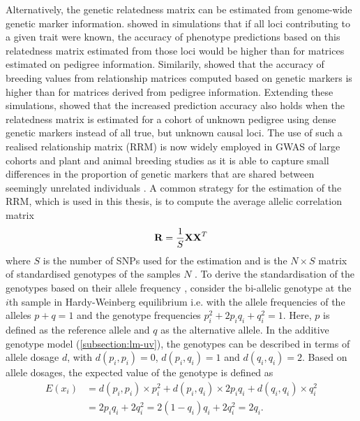 Alternatively, the genetic relatedness matrix can be estimated from genome-wide genetic marker information. \citet{Nejati-Javaremi1997} showed in simulations that if all loci contributing to a given trait were known, the accuracy of phenotype predictions based on this relatedness matrix estimated from those loci would be higher than for matrices estimated on pedigree information. Similarily, \citet{Villanueva2005} showed that the accuracy of breeding values from relationship matrices computed based on genetic markers is higher than for matrices derived from pedigree information. Extending these simulations, \citet{Hayes2009} showed that the increased prediction accuracy also holds when the relatedness matrix is estimated for a cohort of unknown pedigree using dense genetic markers instead of all true, but unknown causal loci. The use of such a realised relationship matrix (RRM) is now widely employed in GWAS of large cohorts and plant and animal breeding studies as it is able to capture small differences in the proportion of genetic markers that are shared between seemingly unrelated individuals \citep{Lee2010,Lopes2013}. A common strategy for the estimation of the RRM, which is used in this thesis, is to compute the average allelic correlation matrix
%
 \begin{equation}
 \boldsymbol{\mathbf{R}} = \frac{1}{S}\boldsymbol{\mathbf{XX}}^T
 \label{eq:relatedness}
 \end{equation}
where \(S\) is the number of SNPs used for the estimation and  is the \(N \times S\) matrix of standardised genotypes of the samples \(N\) \citep{Patterson2006,Yang2011}. To derive the standardisation of the genotypes based on their allele frequency \citep{Patterson2006,Yang2011,Casale2015}, consider the bi-allelic genotype at the \(i\)th sample  in Hardy-Weinberg equilibrium i.e. with the allele frequencies of the alleles  \(p + q =1\) and the genotype frequencies \(p_i^2 + 2p_iq_i + q_i^2 = 1\). Here,  \(p\) is defined as the reference allele and  \(q\) as the alternative allele. In the additive genotype model (\cref{subsection:lm-uv}), the genotypes can be described in terms of allele dosage \(d\), with \(d(p_i,p_i) = 0\), \(d(p_i,q_i) = 1\) and \(d(q_i,q_i) = 2\). Based on allele dosages, the expected value of the genotype is defined as 
\begin{align}
E(x_i) &=  d(p_i,p_i) \times p_i^2 + d(p_i,q_i) \times 2p_iq_i + d(q_i,q_i) \times  q_i^2 \\
		  &= 2p_iq_i + 2q_i^2 = 2(1-q_i)q_i + 2q_i^2 = 2q_i.
\end{align}
